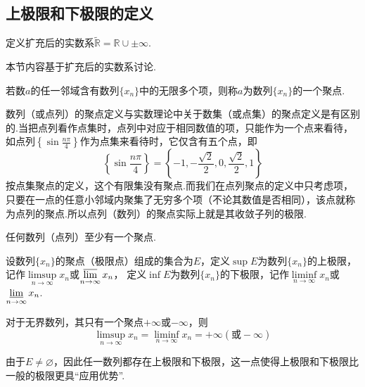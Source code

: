 \subsection{上极限和下极限的定义}
\begin{definition}[实数系的扩充]
	定义扩充后的实数系$\widetilde{\mathbb{R}}=\mathbb{R}\cup \pm\infty$.
\end{definition}
本节内容基于扩充后的实数系讨论.
\begin{definition}[数列的聚点]
	若数$a$的任一邻域含有数列$\{x_n\}$中的无限多个项，则称$a$为数列$\{x_n\}$的一个聚点.
\end{definition}
\begin{remark}
	数列（或点列）的聚点定义与实数理论中关于数集（或点集）的聚点定义是有区别的.当把点列看作点集时，点列中对应于相同数值的项，只能作为一个点来看待，如点列$\left\{\sin\frac{n\pi}{4}\right\}$作为点集来看待时，它仅含有五个点，即
	$$\left\{\sin\frac{n\pi}{4}\right\}=\left\{-1,-\frac{\sqrt{2}}{2},0,\frac{\sqrt{2}}{2},1\right\}$$
	按点集聚点的定义，这个有限集没有聚点.而我们在点列聚点的定义中只考虑项，只要在一点的任意小邻域内聚集了无穷多个项（不论其数值是否相同），该点就称为点列的聚点.所以点列（数列）的聚点实际上就是其收敛子列的极限.
\end{remark}
\begin{theorem}[存在性]
	任何数列（点列）至少有一个聚点.
\end{theorem}
\begin{definition}[上极限与下极限]
	设数列$\{x_n\}$的聚点（极限点）组成的集合为$E$，定义$\sup E$为数列$\{x_n\}$的{\heiti 上极限}，记作$\limsup\limits_{n\to\infty}x_n$或$\varlimsup\limits_{n\to\infty}x_n$，
	定义$\inf E$为数列$\{x_n\}$的{\heiti 下极限}，记作$\liminf\limits_{n\to\infty}x_n$或$\varliminf\limits_{n\to\infty}x_n$.
\end{definition}
对于无界数列，其只有一个聚点$+\infty$或$-\infty$，则$$\limsup\limits_{n\to\infty}x_n=\liminf\limits_{n\to\infty}x_n=+\infty(\text{或}-\infty)$$

由于$E\neq\varnothing$，因此任一数列都存在上极限和下极限，这一点使得上极限和下极限比一般的极限更具“应用优势”.

